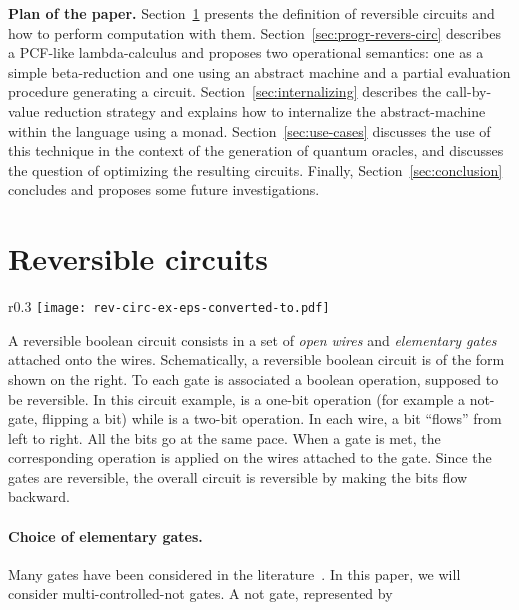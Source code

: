 \documentclass{article}
\theoremstyle{plain}
\theoremstyle{definition}
\newcommand{\define}[1]{{\em #1}}
\begin{document}
\smallskip
\noindent
{\bf Plan of the paper.}
Section~\ref{sec:reversible-circuits} presents the definition of
reversible circuits and how to perform computation with them.
Section~\ref{sec:progr-revers-circ} describes a PCF-like
lambda-calculus and proposes two operational semantics: one as a
simple beta-reduction and one using an abstract machine and a partial
evaluation procedure generating a
circuit. Section~\ref{sec:internalizing} describes the call-by-value
reduction strategy and explains how to internalize the
abstract-machine within the language using a
monad. Section~\ref{sec:use-cases} discusses the use of this technique
in the context of the generation of quantum oracles, and discusses the
question of optimizing the resulting circuits.  Finally,
Section~\ref{sec:conclusion} concludes and proposes some future
investigations.



\section{Reversible circuits}
\label{sec:reversible-circuits}

\begin{wrapfigure}{r}{0.3\textwidth}
\vspace{-10pt}
\texttt{[image: rev-circ-ex-eps-converted-to.pdf]}
\vspace{-10pt}
\end{wrapfigure}
A reversible boolean circuit consists in a set of \define{open wires}
and \define{elementary gates} attached onto the wires. Schematically,
a reversible boolean circuit is of the form shown on the right.
To each gate is associated a boolean operation, supposed to be
reversible. In this circuit example,  is a one-bit operation (for
example a not-gate, flipping a bit) while  is a two-bit
operation. In each wire, a bit ``flows'' from left to right. All the
bits go at the same pace. When a gate is met, the corresponding
operation is applied on the wires attached to the gate. Since the
gates are reversible, the overall circuit is reversible by making the
bits flow backward. 

\paragraph{\bf Choice of elementary gates.}

Many gates have been considered in the
literature~\cite{rev-survey-2011}. In this paper, we will consider
multi-controlled-not gates. A not gate, represented by
\end{document}
